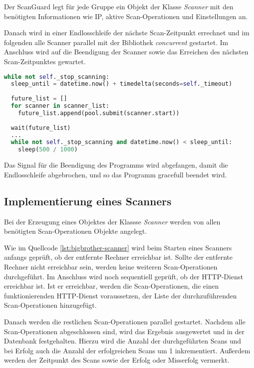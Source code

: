 Der ScanGuard legt für jede Gruppe ein Objekt der Klasse \textit{Scanner} mit den benötigten Informationen wie IP, aktive Scan-Operationen und Einstellungen an.

Danach wird in einer Endlosschleife der nächste Scan-Zeitpunkt errechnet und im folgenden alle Scanner parallel mit der Bibliothek \textit{concurrent} gestartet. Im Anschluss wird auf die Beendigung der Scanner sowie das Erreichen des nächsten Scan-Zeitpunktes gewartet.

\begin{lstlisting}[language=Python, frame=single, caption={Big Brother ScanGuard}, captionpos=b, label={lst:bigbrother-scanguard}]
while not self._stop_scanning:
  sleep_until = datetime.now() + timedelta(seconds=self._timeout)
  
  future_list = []
  for scanner in scanner_list:
    future_list.append(pool.submit(scanner.start))
    
  wait(future_list)
  ...
  while not self._stop_scanning and datetime.now() < sleep_until:
    sleep(500 / 1000)
\end{lstlisting}

Das Signal für die Beendigung des Programms wird abgefangen, damit die Endlosschleife abgebrochen, und so das Programm gracefull beendet wird.

\subsection{Implementierung eines Scanners}
Bei der Erzeugung eines Objektes der Klassse \textit{Scanner} werden von allen benötigten Scan-Operationen Objekte angelegt.

Wie im Quellcode \autoref{lst:bigbrother-scanner} wird beim Starten eines Scanners anfangs geprüft, ob der entfernte Rechner erreichbar ist. Sollte der entfernte Rechner nicht erreichbar sein, werden keine weiteren Scan-Operationen durchgeführt. Im Anschluss wird noch sequentiell geprüft, ob der HTTP-Dienst erreichbar ist. Ist er erreichbar, werden die Scan-Operationen, die einen funktionierenden HTTP-Dienst voraussetzen, der Liste der durchzuführenden Scan-Operationen hinzugefügt.

Danach werden die restlichen Scan-Operationen parallel gestartet. Nachdem alle Scan-Operationen abgeschlossen sind, wird das Ergebnis ausgewertet und in der Datenbank festgehalten. Hierzu wird die Anzahl der durchgeführten Scans und bei Erfolg auch die Anzahl der erfolgreichen Scans um 1 inkrementiert. Außerdem werden der Zeitpunkt des Scans sowie der Erfolg oder Misserfolg vermerkt.

